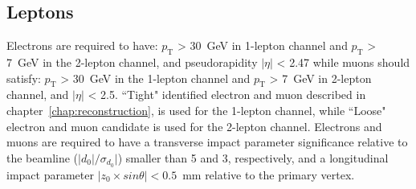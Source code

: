 \begin{table}[H]
\begin{center}
\caption{The list of triggers used in the analysis.} 
\label{tab:Triggers}
\end{center}
\end{table}

\subsection{Leptons}
Electrons are required to have: $p_\mathrm{T}$ > 30~GeV in 1-lepton channel and $p_\mathrm{T}$ > 7~GeV in the 2-lepton channel, and pseudorapidity $|\eta|$ < 2.47 while muons should satisfy: $p_\mathrm{T}$ > 30~GeV in the 1-lepton channel and $p_\mathrm{T}$ > 7~GeV in 2-lepton channel, and $|\eta|$ < 2.5. 
``Tight" identified electron and muon described in chapter~\ref{chap:reconstruction}, is used for the 1-lepton channel, while ``Loose" electron and muon candidate is used for the 2-lepton channel.
Electrons and muons are required to have a transverse impact parameter significance relative to the beamline ($|d_0|/\sigma_{d_0}|$) smaller than 5 and 3, respectively, and a longitudinal impact parameter $|z_0 \times sin \theta | < 0.5$~mm relative to the primary vertex.

